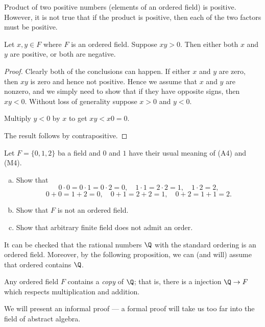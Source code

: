 \documentclass[12pt]{book}
\begin{document}
Product of two positive numbers (elements of an ordered field) is positive.
However, it is not true that if the product is positive, then each of the two
factors must be positive.

\begin{prop}
Let $x,y \in F$ where $F$ is an ordered field.
Suppose 
$xy > 0$.
Then either both $x$ and $y$ are positive, or both are negative.
\end{prop}

\begin{proof}
Clearly both of the conclusions can happen.
If either
$x$ and $y$ are zero, then $xy$ is zero and hence not positive.
Hence we assume that $x$ and $y$ are nonzero,
and we simply need to show that if they have opposite signs, then
$xy < 0$.
Without loss of
generality suppose $x > 0$ and $y < 0$.

Multiply $y < 0$ by $x$ to get
$xy < x0 = 0$.

The result follows by contrapositive.
\end{proof}

\begin{exercise}
Let $F = \{ 0, 1, 2 \}$ ba a field and $0$ and $1$ have their usual meaning of (A4) and (M4).
\begin{enumerate}[a)]
\item Show that  
\[0\cdot0=0\cdot 1=0\cdot 2=0,\quad 1\cdot 1=2\cdot 2=1,\quad 1\cdot 2=2,\]
\[0+0=1+2=0,\quad 0+ 1=2+ 2=1,\quad 0+2=1+1=2.\]
\item Show that $F$ is not an ordered field.
\item Show that arbitrary finite field does not admit an order.
\end{enumerate}
\end{exercise}

It can be checked that the rational numbers $\Q$ with the
standard ordering is an ordered field.
Moreover, by the following proposition, we can (and will) assume that ordered contains $\Q$.

\begin{prop}\label{prop:QinF}
Any ordered field $F$ contains a \emph{copy} of $\Q$;
that is, there is a injection $\Q\to F$ which respects multiplication and addition. 
\end{prop}

We will present an informal proof --- a formal proof will take us too far into the field of abstract algebra.
\end{document}
